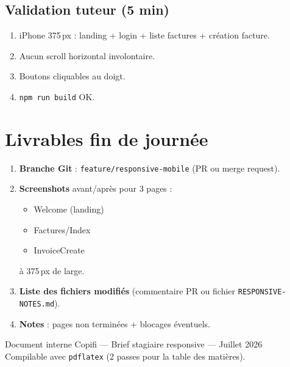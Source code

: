 \documentclass[11pt,a4paper]{report}
\newcommand{\filepath}[1]{\texttt{\small #1}}
\begin{document}
\section{Validation tuteur (5 min)}

\begin{enumerate}[leftmargin=1.5em]
    \item iPhone 375\,px : landing + login + liste factures + création facture.
    \item Aucun scroll horizontal involontaire.
    \item Boutons cliquables au doigt.
    \item \texttt{npm run build} OK.
\end{enumerate}

\chapter{Livrables fin de journée}

\begin{enumerate}[leftmargin=1.5em]
    \item \textbf{Branche Git} : \filepath{feature/responsive-mobile} (PR ou merge request).
    \item \textbf{Screenshots} avant/après pour 3 pages :
    \begin{itemize}
        \item Welcome (landing)
        \item Factures/Index
        \item InvoiceCreate
    \end{itemize}
    à 375\,px de large.
    \item \textbf{Liste des fichiers modifiés} (commentaire PR ou fichier \filepath{RESPONSIVE-NOTES.md}).
    \item \textbf{Notes} : pages non terminées + blocages éventuels.
\end{enumerate}

\vfill
\begin{center}
\small\color{copifizinc500}
Document interne Copifi — Brief stagiaire responsive — Juillet 2026\\
Compilable avec \texttt{pdflatex} (2 passes pour la table des matières).
\end{center}
\end{document}
